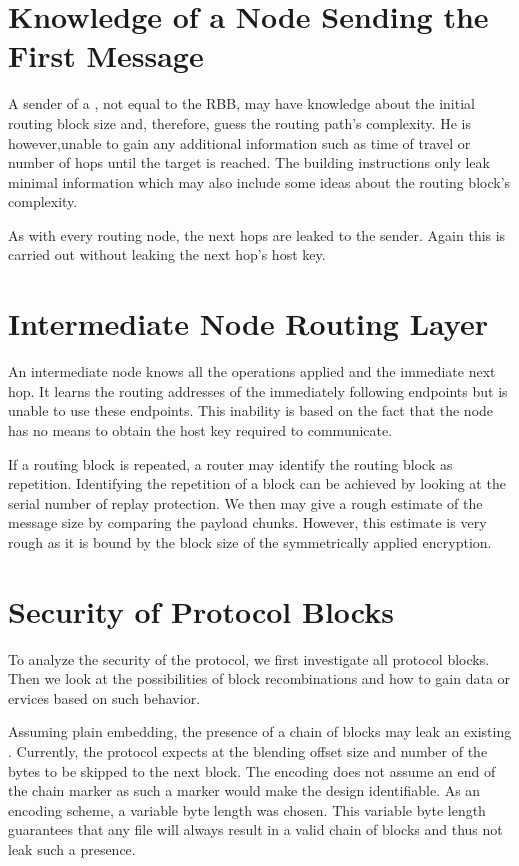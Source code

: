 \section{Knowledge of a Node Sending the First Message}
A sender of a \VortexMessage{}, not equal to the RBB, may have knowledge about the initial routing block size and, therefore, guess the routing path's complexity. He is however,unable to gain any additional information such as time of travel or number of hops until the target is reached. The building instructions only leak minimal information which may also include some ideas about the routing block's complexity. 

As with every routing node, the next hops are leaked to the sender. Again this is carried out without leaking the next hop's host key.

\section{Intermediate Node Routing Layer}
An intermediate node knows all the operations applied and the immediate next hop. It learns the routing addresses of the immediately following endpoints but is unable to use these endpoints. This inability is based on the fact that the node has no means to obtain the host key required to communicate.

If a routing block is repeated, a router may identify the routing block as repetition. Identifying the repetition of a block can be achieved by looking at the serial number of replay protection. We then may give a rough estimate of the message size by comparing the payload chunks. However, this estimate is very rough as it is bound by the block size of the symmetrically applied encryption.

\section{Security of Protocol Blocks}
To analyze the security of the protocol, we first investigate all protocol blocks. Then we look at the possibilities of block recombinations and how to gain data or ervices based on such behavior. 

Assuming plain embedding, the presence of a chain of blocks may leak an existing \VortexMessage. Currently, the protocol expects at the blending offset size and number of the bytes to be skipped to the next block. The encoding does not assume an end of the chain marker as such a marker would make the design identifiable. As an encoding scheme, a variable byte length was chosen. This variable byte length guarantees that any file will always result in a valid chain of blocks and thus not leak such a presence.

